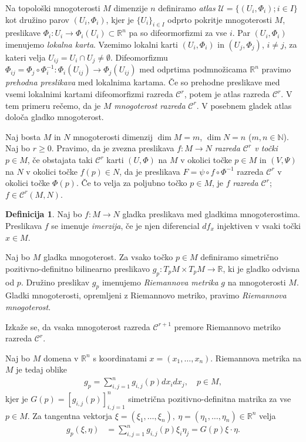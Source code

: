 \documentclass[12pt,a4paper,twoside]{article}
\theoremstyle{definition} %
\newtheorem{definicija}{Definicija}[section]
\theoremstyle{plain} %
\numberwithin{equation}{section}  %
\newcommand{\R}{\mathbb R}
\newcommand{\N}{\mathbb N}
\begin{document}
Na topološki mnogoterosti $M$ dimenzije $n$ definiramo \emph{atlas} $\mathcal{U} = \{ (U_{i}, \Phi_{i}) ; i \in I \}$ kot družino parov $(U_{i}, \Phi_{i})$, kjer je $\{ U_{i} \}_{i \in I}$ odprto pokritje mnogoterosti $M$, preslikave $\Phi_{i} \colon U_{i} \to \Phi_{i}(U_{i}) \subset \R^{n}$ pa so difeormorfizmi za vse $i$. Par $(U_{i}, \Phi_{i})$ imenujemo \emph{lokalna karta}.
Vzemimo lokalni karti $(U_{i}, \Phi_{i})$ in $(U_{j}, \Phi_{j})$, $i \neq j$, za kateri velja $U_{ij}=U_{i} \cap U_{j} \neq \emptyset$. Difeomorfizmu $\Phi_{ij} = \Phi_{j} \circ \Phi_{i}^{-1} \colon \Phi_{i}(U_{ij}) \to \Phi_{j}(U_{ij})$ med odprtima podmnožicama $\R^{n}$ pravimo \emph{prehodna preslikava} med lokalnima kartama. Če so prehodne preslikave med vsemi lokalnimi kartami difeomorfizmi razreda $\mathcal{C}^{r}$, potem je atlas razreda $\mathcal{C}^{r}$. V tem primeru rečemo, da je $M$ \emph{mnogoterost razreda} $\mathcal{C}^{r}$.
V posebnem gladek atlas določa gladko mnogoterost.

Naj bosta $M$ in $N$ mnogoterosti dimenzij $\dim M = m$, $\dim N = n$ ($m, n \in \N$). Naj bo $r \geq 0$. Pravimo, da je zvezna preslikava $f \colon M \to N$ \emph{razreda $\mathcal{C}^{r}$ v točki} $p \in M$, če obstajata taki $\mathcal{C}^{r}$ karti $(U, \Phi)$ na $M$ v okolici točke $p \in M$ in $(V, \Psi)$ na $N$ v okolici točke $f(p) \in N$, da je preslikava $F = \psi \circ f \circ \Phi^{-1}$ razreda $\mathcal{C}^{r}$ v okolici točke $\Phi(p)$.
Če to velja za poljubno točko $p \in M$, je $f$ \emph{razreda $\mathcal{C}^{r}$}; $f \in  \mathcal{C}^{r}(M,N)$.

\begin{definicija}
Naj bo $f \colon M \to N$ gladka preslikava med gladkima mnogoterostima. Preslikava $f$ se imenuje \emph{imerzija}, če je njen diferencial $df_{x}$ injektiven v vsaki točki $x \in M$.
\end{definicija}

Naj bo $M$ gladka mnogoterost. Za vsako točko $p \in M$ definiramo simetrično pozitivno-definitno bilinearno preslikavo $g_{p} \colon T_{p}M \times T_{p}M \to \R$, ki je gladko odvisna od $p$. Družino preslikav $g_{p}$ imenujemo \emph{Riemannova metrika} $g$ na mnogoterosti $M$.
Gladki mnogoterosti, opremljeni z Riemannovo metriko, pravimo \emph{Riemannova mnogoterost}.

Izkaže se, da vsaka mnogoterost razreda $\mathcal{C}^{r+1}$ premore Riemannovo metriko razreda $\mathcal{C}^{r}$.

Naj bo $M$ domena v $\R^{n}$ s koordinatami $x = (x_{1}, \dots, x_{n})$. Riemannova metrika na $M$ je tedaj oblike
\begin{align}
g_{p} = \sum_{i,j=1}^{n} g_{i,j}(p) dx_{i} dx_{j}, \quad p \in M,
\end{align}
kjer je $G(p) = [g_{i,j}(p)]_{i,j=1}^{n}$ simetrična pozitivno-definitna matrika za vse $p \in M$. Za tangentna vektorja $\xi = (\xi_{1}, \dots, \xi_{n}), \ \eta = (\eta_{1}, \dots, \eta_{n}) \in \R^{n}$ velja
\begin{align}
g_{p}(\xi, \eta) &= \sum_{i,j=1}^{n} g_{i,j}(p) \xi_{i} \eta_{j} = G(p) \xi \cdot \eta.
\end{align}
\end{document}
